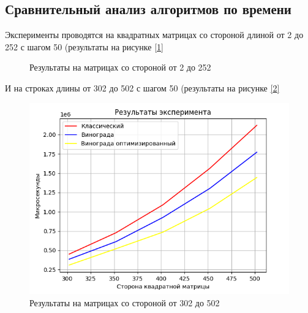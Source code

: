 \documentclass{article}
\begin{document}
	\subsection{Сравнительный анализ алгоритмов по времени}
	Эксперименты проводятся на квадратных матрицах со стороной длиной от 2 до 252 с шагом 50 (результаты на рисунке \hyperref[resultShort]{[\ref{resultShort}]}
	\begin{figure}[h!]
		 	\caption{Результаты на матрицах со стороной от 2 до 252}
		 	\label{resultShort}
	 	\end{figure}
	 	\newpage
	И на строках длины от 302 до 502 с шагом 50 (результаты на рисунке \hyperref[resultLong]{[\ref{resultLong}]}
	\begin{figure}[h!]
		 	\includegraphics{resultLong.png}
		 	\caption{Результаты на матрицах со стороной от 302 до 502}
		 	\label{resultLong}
	 	\end{figure}
	 	\newpage
\end{document}
